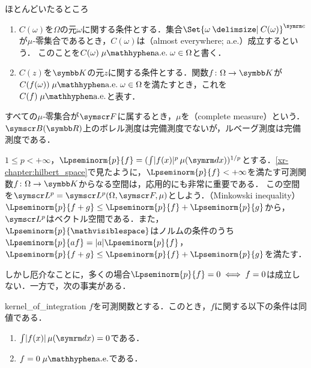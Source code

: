 \documentclass[../../main]{subfiles}
\begin{document}
\begin{definition}{ほとんどいたるところ}{}
  \begin{enumerate}
    \item \(C(\omega)\)を\(\Omega\)の元\(\omega\)に関する条件とする．集合\(\scomp{\Set{\omega\given C(\omega)}}\)が\(\mu\)‐零集合であるとき，\(C(\omega)\)は（almost everywhere; a{.}e{.}）成立するという．
      このことを\(C(\omega)\almosteverywhere[\mu][\omega\in\Omega]\)と書く．
    \item \(C(z)\)を\(\numset{K}\)の元\(z\)に関する条件とする．関数\(f\colon\Omega\to\numset{K}\)が\(C(f(\omega))\almosteverywhere[\mu][\omega\in\Omega]\)を満たすとき，これを\(C(f)\almosteverywhere[\mu]\)と表す．
  \end{enumerate}
\end{definition}

\begin{note}
  すべての\(\mu\)‐零集合が\(\sigmaalg{F}\)に属するとき，\(\mu\)を（complete measure）という．
  \(\borelset{\numset{R}}\)上のボレル測度は完備測度でないが，ルベーグ測度は完備測度である．
\end{note}

\(1\leq p<+\infty\)，\(\Lpseminorm{p}{f}=(\int\abs{f(x)}^p\measured[x]{\mu})^{1/p}\)とする．\cref{xr-chapter:hilbert_space}で見たように，\(\Lpseminorm{p}{f}<+\infty\)を満たす可測関数\(f\colon\Omega\to\numset{K}\)からなる空間は，応用的にも非常に重要である．
この空間を\(\Lebesgue*{p}=\Lebesgue*{p}(\Omega,\sigmaalg{F},\mu)\)としよう．（Minkowski inequality）\(\Lpseminorm{p}{f+g}\leq\Lpseminorm{p}{f}+\Lpseminorm{p}{g}\)から，
\(\Lebesgue*{p}\)はベクトル空間である．また，\(\Lpseminorm{p}{\holder}\)はノルムの条件のうち\(\Lpseminorm{p}{af}=\abs{a}\Lpseminorm{p}{f}\)，\(\Lpseminorm{p}{f+g}\leq\Lpseminorm{p}{f}+\Lpseminorm{p}{g}\)を満たす．

しかし厄介なことに，多くの場合\(\Lpseminorm{p}{f}=0\iff f=0\)は成立しない．一方で，次の事実がある．

\begin{proposition}{}{kernel_of_integration}
  \(f\)を可測関数とする．このとき，\(f\)に関する以下の条件は同値である．
  \begin{enumerate}
    \item \(\int\abs{f(x)}\measured[x]{\mu}=0\)である．
    \item \(f=0\almosteverywhere[\mu]\)である．
  \end{enumerate}
\end{proposition}
\end{document}

